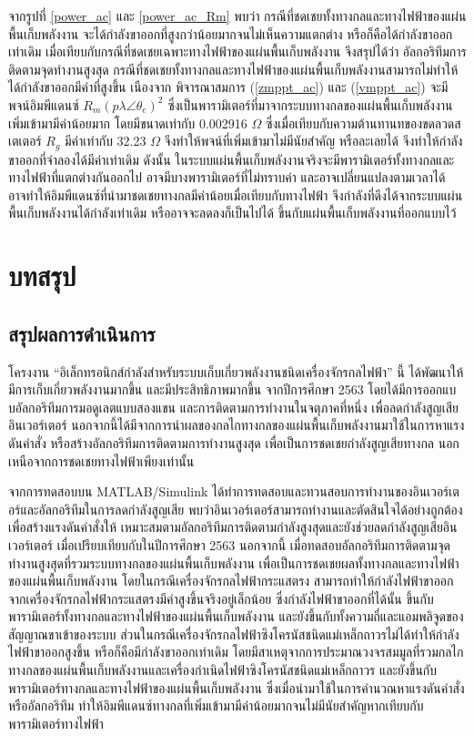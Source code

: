 \documentclass[11pt,a4paper]{article}
\begin{document}
จากรูปที่ \ref{power_ac} และ \ref{power_ac_Rm} พบว่า กรณีที่ชดเชยทั้งทางกลและทางไฟฟ้าของแผ่นพื้นเก็บพลังงาน จะได้กำลังขาออกที่สูงกว่าน้อยมากจนไม่เห็นความแตกต่าง หรือก็คือได้กำลังขาออกเท่าเดิม เมื่อเทียบกับกรณีที่ชดเชยเฉพาะทางไฟฟ้าของแผ่นพื้นเก็บพลังงาน
จึงสรุปได้ว่า อัลกอริทึมการติดตามจุดทำงานสูงสุด กรณีที่ชดเชยทั้งทางกลและทางไฟฟ้าของแผ่นพื้นเก็บพลังงานสามารถไม่ทำให้ได้กำลังขาออกมีค่าที่สูงขึ้น เนืองจาก พิจารณาสมการ (\ref{zmppt_ac}) และ (\ref{vmppt_ac}) จะมีพจน์อิมพีแดนซ์ $R_{m}(p\lambda \angle \theta_{e})^2$ 
ซึ่งเป็นพารามิเตอร์ที่มาจากระบบทางกลของแผ่นพื้นเก็บพลังงานเพิ่มเข้ามามีค่าน้อยมาก โดยมีขนาดเท่ากับ 0.002916 $\Omega$ ซึ่งเมื่อเทียบกับความต้านทานทของขดลวดสเตเตอร์ $R_{g}$ มีค่าเท่ากับ 32.23 $\Omega$ จึงทำให้พจน์ที่เพิ่มเข้ามาไม่มีนัยสำคัญ หรือละเลยได้ จึงทำให้กำลังขาออกที่จำลองได้มีค่าเท่าเดิม    
ดังนั้น ในระบบแผ่นพื้นเก็บพลังงานจริงจะมีพารามิเตอร์ทั้งทางกลและทางไฟฟ้าที่แตกต่างกันออกไป อาจมีบางพารามิเตอร์ที่ไม่ทราบค่า และอาจเปลี่ยนแปลงตามเวลาได้ อาจทำให้อิมพีแดนซ์ที่นำมาชดเชยทางกลมีค่าน้อยเมื่อเทียบกับทางไฟฟ้า จึงกำลังที่ดึงได้จากระบบแผ่นพื้นเก็บพลังงานได้กำลังเท่าเดิม หรืออาจจะลดลงก็เป็นไปได้ ขึ้นกับแผ่นพื้นเก็บพลังงานที่ออกแบบไว้  

\newpage
\section{บทสรุป}
\subsection{สรุปผลการดำเนินการ}
โครงงาน “อิเล็กทรอนิกส์กำลังสำหรับระบบเก็บเกี่ยวพลังงานชนิดเครื่องจักรกลไฟฟ้า” นี้ ได้พัฒนาให้มีการเก็บเกี่ยวพลังงานมากขึ้น และมีประสิทธิภาพมากขึ้น จากปีการศึกษา 2563 โดยได้มีการออกแบบอัลกอริทึมการมอดูเลตแบบสองแขน และการติดตามการทำงานในจตุภาคที่หนึ่ง เพื่อลดกำลังสูญเสียอินเวอร์เตอร์ นอกจากนี้ได้มีจากการนำผลของกลไกทางกลของแผ่นพื้นเก็บพลังงานมาใช้ในการหาแรงดันคำสั่ง หรือสร้างอัลกอริทึมการติดตามการทำงานสูงสุด เพื่อเป็นการชดเชยกำลังสูญเสียทางกล นอกเหนือจากการชดเชยทางไฟฟ้าเพียงเท่านั้น

จากการทดสอบบน MATLAB/Simulink ได้ทำการทดสอบและทวนสอบการทำงานของอินเวอร์เตอร์และอัลกอริทึมในการลดกำลังสูญเสีย พบว่าอินเวอร์เตอร์สามารถทำงานและตัดสินใจได้อย่างถูกต้อง เพื่อสร้างแรงดันคำสั่งให้ เหมาะสมตามอัลกอริทึมการติดตามกำลังสูงสุดและยังช่วยลดกำลังสูญเสียอินเวอร์เตอร์ เมื่อเปรียบเทียบกับในปีการศึกษา 2563 นอกจากนี้ เมื่อทดสอบอัลกอริทึมการติดตามจุดทำงานสูงสุดที่รวมระบบทางกลของแผ่นพื้นเก็บพลังงาน เพื่อเป็นการชดเชยผลทั้งทางกลและทางไฟฟ้าของแผ่นพื้นเก็บพลังงาน โดยในกรณีเครื่องจักรกลไฟฟ้ากระแสตรง สามารถทำให้กำลังไฟฟ้าขาออกจากเครื่องจักรกลไฟฟ้ากระแสตรงมีค่าสูงขึ้นจริงอยู่เล็กน้อย ซึ่งกำลังไฟฟ้าขาออกที่ได้นั้น ขึ้นกับพารามิเตอร์ทั้งทางกลและทางไฟฟ้าของแผ่นพื้นเก็บพลังงาน และยังขึ้นกับทั้งความถี่และแอมพลิจูดของสัญญาณขาเข้าของระบบ ส่วนในกรณีเครื่องจักรกลไฟฟ้าซิงโครนัสชนิดแม่เหล็กถาวรไม่ได้ทำให้กำลังไฟฟ้าขาออกสูงขึ้น หรือก็คือมีกำลังขาออกเท่าเดิม โดยมีสาเหตุจากการประมาณวงจรสมมูลที่รวมกลไกทางกลของแผ่นพื้นเก็บพลังงานและเครื่องกำเนิดไฟฟ้าซิงโครนัสชนิดแม่เหล็กถาวร และยังขึ้นกับพารามิเตอร์ทางกลและทางไฟฟ้าของแผ่นพื้นเก็บพลังงาน ซึ่งเมื่อนำมาใช้ในการคำนวณหาแรงดันคำสั่งหรืออัลกอริทึม ทำให้อิมพีแดนซ์ทางกลที่เพิ่มเข้ามามีค่าน้อยมากจนไม่มีนัยสำคัญหากเทียบกับพารามิเตอร์ทางไฟฟ้า
\end{document}
